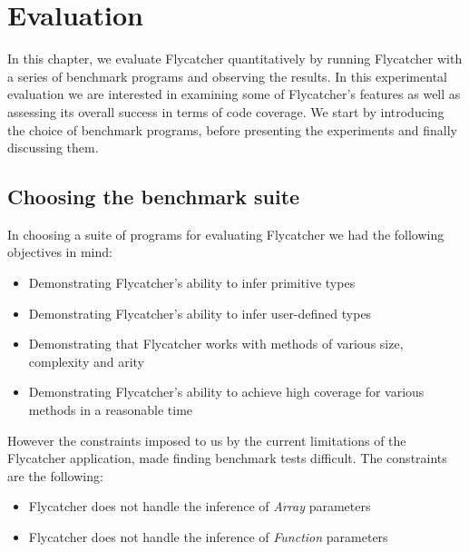 \chapter{Evaluation}
In this chapter, we evaluate \textsf{Flycatcher} quantitatively by running \textsf{Flycatcher} with a series of benchmark programs and observing the results. In this experimental evaluation we are interested in examining some of \textsf{Flycatcher}'s features as well as assessing its overall success in terms of code coverage. We start by introducing the choice of benchmark programs, before presenting the experiments and finally discussing them.


\section{Choosing the benchmark suite}
In choosing a suite of programs for evaluating \textsf{Flycatcher} we had the following objectives in mind:

\begin{itemize}
   \item Demonstrating \textsf{Flycatcher}'s ability to infer primitive types
   \item Demonstrating \textsf{Flycatcher}'s ability to infer user-defined types
   \item Demonstrating that \textsf{Flycatcher} works with methods of various size, complexity and arity
   \item Demonstrating \textsf{Flycatcher}'s ability to achieve high coverage for various methods in a reasonable time
\end{itemize}

However the constraints imposed to us by the current limitations of the \textsf{Flycatcher} application, made finding benchmark tests difficult. The constraints are the following:

\begin{itemize}
   \item \textsf{Flycatcher} does not handle the inference of \textit{Array} parameters
   \item \textsf{Flycatcher} does not handle the inference of \textit{Function} parameters
\end{itemize}

